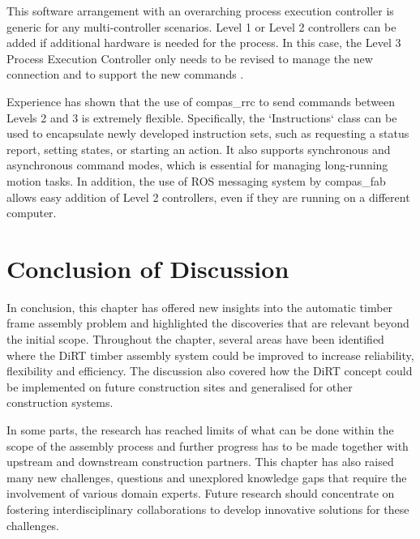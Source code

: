 This software arrangement with an overarching process execution controller is generic for any multi-controller scenarios. Level 1 or Level 2 controllers can be added if additional hardware is needed for the process. In this case, the Level 3 Process Execution Controller only needs to be revised to manage the new connection and to support the new commands . 

Experience has shown that the use of compas\_rrc \parencite{fleischmannCOMPASRRCOnline2020} to send commands between Levels 2 and 3 is extremely flexible. Specifically, the `Instructions` class can be used to encapsulate newly developed instruction sets, such as requesting a status report, setting states, or starting an action. It also supports synchronous and asynchronous command modes, which is essential for managing long-running motion tasks. In addition, the use of ROS messaging system by compas\_fab allows easy addition of Level 2 controllers, even if they are running on a different computer. 

\FloatBarrier
\section{Conclusion of Discussion}
\label{section:conclusion-of-discussion}

In conclusion, this chapter has offered new insights into the automatic timber frame assembly problem and highlighted the discoveries that are relevant beyond the initial scope. Throughout the chapter, several areas have been identified where the DiRT timber assembly system could be improved to increase reliability, flexibility and efficiency. The discussion also covered how the DiRT concept could be implemented on future construction sites and generalised for other construction systems. 

In some parts, the research has reached limits of what can be done within the scope of the assembly process and further progress has to be made together with upstream and downstream construction partners. This chapter has also raised many new challenges, questions and unexplored knowledge gaps that require the involvement of various domain experts. Future research should concentrate on fostering interdisciplinary collaborations to develop innovative solutions for these challenges.
